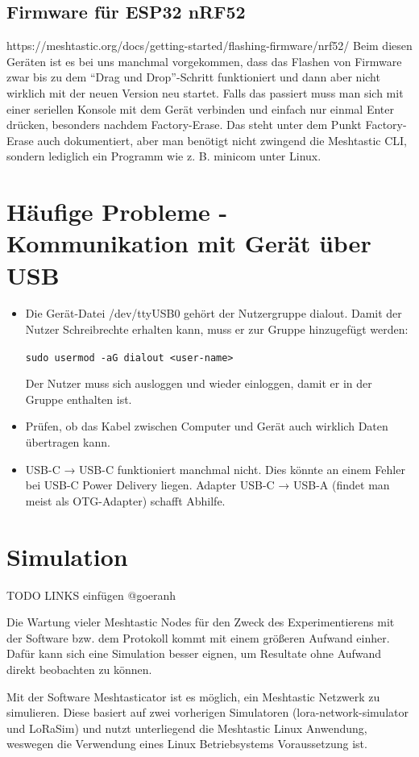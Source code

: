 \documentclass[12pt,a4paper]{article}
\begin{document}
\subsection{Firmware für ESP32 nRF52}
https://meshtastic.org/docs/getting-started/flashing-firmware/nrf52/ Beim diesen Geräten ist es bei uns manchmal vorgekommen, dass das Flashen von Firmware zwar bis zu dem “Drag und Drop”-Schritt funktioniert und dann aber nicht wirklich mit der neuen Version neu startet. Falls das passiert muss man sich mit einer seriellen Konsole mit dem Gerät verbinden und einfach nur einmal Enter drücken, besonders nachdem Factory-Erase. Das steht unter dem Punkt Factory-Erase auch dokumentiert, aber man benötigt nicht zwingend die Meshtastic CLI, sondern lediglich ein Programm wie z. B. minicom unter Linux.

\section{Häufige Probleme - Kommunikation mit Gerät über USB}
\begin{itemize}
	\item Die Gerät-Datei /dev/ttyUSB0 gehört der Nutzergruppe dialout. Damit der Nutzer Schreibrechte erhalten kann, muss er zur Gruppe hinzugefügt werden:
	
	\lstinline{sudo usermod -aG dialout <user-name>}
	
	Der Nutzer muss sich ausloggen und wieder einloggen, damit er in der Gruppe enthalten ist.
	\item Prüfen, ob das Kabel zwischen Computer und Gerät auch wirklich Daten übertragen kann.
	\item USB-C → USB-C funktioniert manchmal nicht. Dies könnte an einem Fehler bei USB-C Power Delivery liegen. Adapter USB-C → USB-A (findet man meist als OTG-Adapter) schafft Abhilfe.
\end{itemize}

\section{Simulation}
TODO LINKS einfügen @goeranh

Die Wartung vieler Meshtastic Nodes für den Zweck des Experimentierens mit der Software bzw. dem Protokoll kommt mit einem größeren Aufwand einher. Dafür kann sich eine Simulation besser eignen, um Resultate ohne Aufwand direkt beobachten zu können.

Mit der Software Meshtasticator ist es möglich, ein Meshtastic Netzwerk zu simulieren. Diese basiert auf zwei vorherigen Simulatoren (lora-network-simulator und LoRaSim) und nutzt unterliegend die Meshtastic Linux Anwendung, weswegen die Verwendung eines Linux Betriebsystems Voraussetzung ist.
\end{document}
